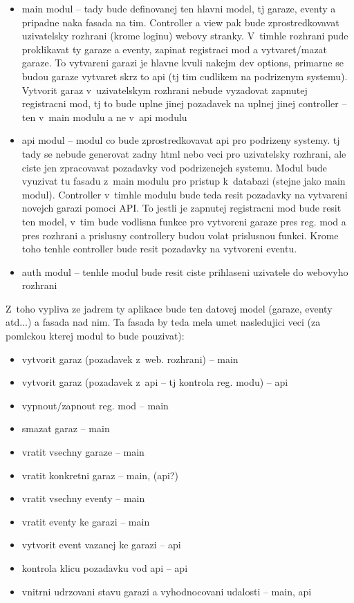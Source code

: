 \begin{itemize}
    \item main modul -- tady bude definovanej ten hlavni model, tj garaze, eventy a pripadne naka fasada na tim. Controller a view pak bude zprostredkovavat uzivatelsky rozhrani (krome loginu) webovy stranky. V~timhle rozhrani pude proklikavat ty garaze a eventy, zapinat registraci mod a vytvaret/mazat garaze. To vytvareni garazi je hlavne kvuli nakejm dev options, primarne se budou garaze vytvaret skrz to api (tj tim cudlikem na podrizenym systemu). Vytvorit garaz v~uzivatelskym rozhrani nebude vyzadovat zapnutej registracni mod, tj to bude uplne jinej pozadavek na uplnej jinej controller -- ten v~main modulu a ne v~api modulu
    \item api modul -- modul co bude zprostredkovavat api pro podrizeny systemy. tj tady se nebude generovat zadny html nebo veci pro uzivatelsky rozhrani, ale ciste jen zpracovavat pozadavky vod podrizenejch systemu. Modul bude vyuzivat tu fasadu z~main modulu pro pristup k~databazi (stejne jako main modul). Controller v~timhle modulu bude teda resit pozadavky na vytvareni novejch garazi pomoci API. To jestli je zapnutej registracni mod bude resit ten model, v~tim bude vodlisna funkce pro vytvoreni garaze pres reg. mod a pres rozhrani a prislusny controllery budou volat prislusnou funkci. Krome toho tenhle controller bude resit pozadavky na vytvoreni eventu.
    \item auth modul -- tenhle modul bude resit ciste prihlaseni uzivatele do webovyho rozhrani
\end{itemize}

Z~toho vypliva ze jadrem ty aplikace bude ten datovej model (garaze, eventy atd...) a fasada nad nim. Ta fasada by teda mela umet nasledujici veci (za pomlckou kterej modul to bude pouzivat):

\begin{itemize}
    \item vytvorit garaz (pozadavek z~web. rozhrani) -- main
    \item vytvorit garaz (pozadavek z~api -- tj kontrola reg. modu) -- api
    \item vypnout/zapnout reg. mod -- main
    \item smazat garaz -- main
    \item vratit vsechny garaze -- main
    \item vratit konkretni garaz -- main, (api?)
    \item vratit vsechny eventy -- main
    \item vratit eventy ke garazi -- main
    \item vytvorit event vazanej ke garazi -- api
    \item kontrola klicu pozadavku vod api -- api
    \item vnitrni udrzovani stavu garazi a vyhodnocovani udalosti -- main, api
\end{itemize}

